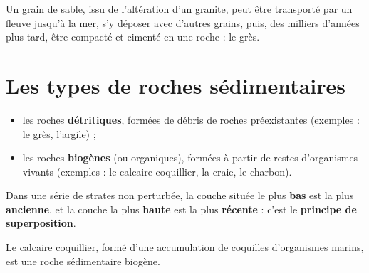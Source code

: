 \begin{exemple}
Un grain de sable, issu de l'altération d'un granite, peut être transporté par un
fleuve jusqu'à la mer, s'y déposer avec d'autres grains, puis, des milliers d'années
plus tard, être compacté et cimenté en une roche : le grès.
\end{exemple}

\section{Les types de roches sédimentaires}

\begin{propriete}
\begin{itemize}
\item les roches \textbf{détritiques}, formées de débris de roches préexistantes
(exemples : le grès, l'argile) ;
\item les roches \textbf{biogènes} (ou organiques), formées à partir de restes
d'organismes vivants (exemples : le calcaire coquillier, la craie, le charbon).
\end{itemize}
\end{propriete}

\begin{definition}
Dans une série de strates non perturbée, la couche située le plus \textbf{bas} est
la plus \textbf{ancienne}, et la couche la plus \textbf{haute} est la plus
\textbf{récente} : c'est le \textbf{principe de superposition}.
\end{definition}

\begin{illus}
\end{illus}

\begin{exemple}
Le calcaire coquillier, formé d'une accumulation de coquilles d'organismes marins, est
une roche sédimentaire biogène.
\end{exemple}

